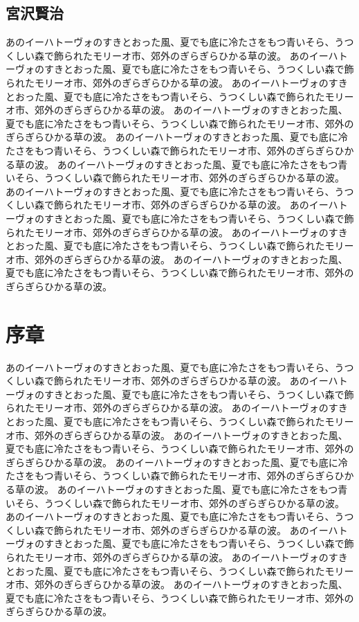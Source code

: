 \documentclass[b5j,12pt]{ltjsbook}
\begin{document}
\section*{宮沢賢治}

あのイーハトーヴォのすきとおった風、夏でも底に冷たさをもつ青いそら、うつくしい森で飾られたモリーオ市、郊外のぎらぎらひかる草の波。
あのイーハトーヴォのすきとおった風、夏でも底に冷たさをもつ青いそら、うつくしい森で飾られたモリーオ市、郊外のぎらぎらひかる草の波。
あのイーハトーヴォのすきとおった風、夏でも底に冷たさをもつ青いそら、うつくしい森で飾られたモリーオ市、郊外のぎらぎらひかる草の波。
あのイーハトーヴォのすきとおった風、夏でも底に冷たさをもつ青いそら、うつくしい森で飾られたモリーオ市、郊外のぎらぎらひかる草の波。
あのイーハトーヴォのすきとおった風、夏でも底に冷たさをもつ青いそら、うつくしい森で飾られたモリーオ市、郊外のぎらぎらひかる草の波。
あのイーハトーヴォのすきとおった風、夏でも底に冷たさをもつ青いそら、うつくしい森で飾られたモリーオ市、郊外のぎらぎらひかる草の波。
あのイーハトーヴォのすきとおった風、夏でも底に冷たさをもつ青いそら、うつくしい森で飾られたモリーオ市、郊外のぎらぎらひかる草の波。
あのイーハトーヴォのすきとおった風、夏でも底に冷たさをもつ青いそら、うつくしい森で飾られたモリーオ市、郊外のぎらぎらひかる草の波。
あのイーハトーヴォのすきとおった風、夏でも底に冷たさをもつ青いそら、うつくしい森で飾られたモリーオ市、郊外のぎらぎらひかる草の波。
あのイーハトーヴォのすきとおった風、夏でも底に冷たさをもつ青いそら、うつくしい森で飾られたモリーオ市、郊外のぎらぎらひかる草の波。

\tableofcontents
\mainmatter
{}

\chapter{序章}

あのイーハトーヴォのすきとおった風、夏でも底に冷たさをもつ青いそら、うつくしい森で飾られたモリーオ市、郊外のぎらぎらひかる草の波。
あのイーハトーヴォのすきとおった風、夏でも底に冷たさをもつ青いそら、うつくしい森で飾られたモリーオ市、郊外のぎらぎらひかる草の波。
あのイーハトーヴォのすきとおった風、夏でも底に冷たさをもつ青いそら、うつくしい森で飾られたモリーオ市、郊外のぎらぎらひかる草の波。
あのイーハトーヴォのすきとおった風、夏でも底に冷たさをもつ青いそら、うつくしい森で飾られたモリーオ市、郊外のぎらぎらひかる草の波。
あのイーハトーヴォのすきとおった風、夏でも底に冷たさをもつ青いそら、うつくしい森で飾られたモリーオ市、郊外のぎらぎらひかる草の波。
あのイーハトーヴォのすきとおった風、夏でも底に冷たさをもつ青いそら、うつくしい森で飾られたモリーオ市、郊外のぎらぎらひかる草の波。
あのイーハトーヴォのすきとおった風、夏でも底に冷たさをもつ青いそら、うつくしい森で飾られたモリーオ市、郊外のぎらぎらひかる草の波。
あのイーハトーヴォのすきとおった風、夏でも底に冷たさをもつ青いそら、うつくしい森で飾られたモリーオ市、郊外のぎらぎらひかる草の波。
あのイーハトーヴォのすきとおった風、夏でも底に冷たさをもつ青いそら、うつくしい森で飾られたモリーオ市、郊外のぎらぎらひかる草の波。
あのイーハトーヴォのすきとおった風、夏でも底に冷たさをもつ青いそら、うつくしい森で飾られたモリーオ市、郊外のぎらぎらひかる草の波。
\end{document}
